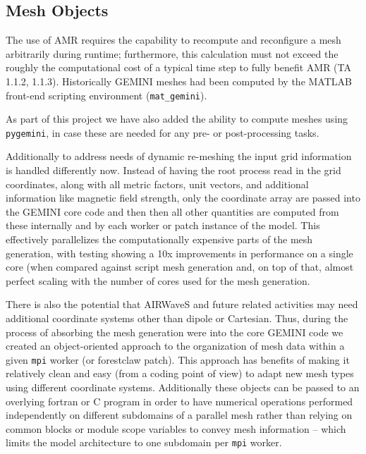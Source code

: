 \documentclass[11pt,letterpaper]{article}
\begin{document}
\subsection{Mesh Objects}

The use of AMR requires the capability to recompute and reconfigure a mesh arbitrarily during runtime; furthermore, this calculation must not exceed the roughly the computational cost of a typical time step to fully benefit AMR (TA 1.1.2, 1.1.3).  Historically GEMINI meshes had been computed by the MATLAB front-end scripting environment (\texttt{mat\_gemini}).

As part of this project we have also added the ability to compute meshes using \texttt{pygemini}, in case these are needed for any pre- or post-processing tasks.  

Additionally to address needs of dynamic re-meshing the input grid information is handled differently now.  Instead of having the root process read in the grid coordinates, along with all metric factors, unit vectors, and additional information like magnetic field strength, only the coordinate array are passed into the GEMINI core code and then then all other quantities are computed from these internally and by each worker or patch instance of the model.  This effectively parallelizes the computationally expensive parts of the mesh generation, with testing showing a 10x improvements in performance on a single core (when compared against script mesh generation and, on top of that, almost perfect scaling with the number of cores used for the mesh generation.

There is also the potential that AIRWaveS and future related activities may need additional coordinate systems other than dipole or Cartesian.  Thus, during the process of absorbing the mesh generation were into the core GEMINI code we created an object-oriented approach to the organization of mesh data within a given \texttt{mpi} worker (or forestclaw patch).  This approach has benefits of making it relatively clean and easy (from a coding point of view) to adapt new mesh types using different coordinate systems. Additionally these objects can be passed to an overlying fortran or C program in order to have numerical operations performed independently on different subdomains of a parallel mesh rather than relying on common blocks or module scope variables to convey mesh information -- which limits the model architecture to one subdomain per \texttt{mpi} worker.
\end{document}

